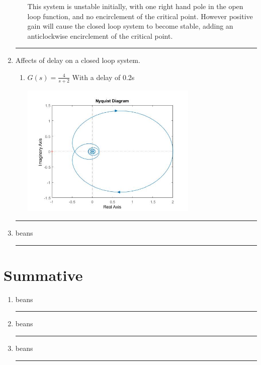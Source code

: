 \documentclass[a4paper,11pt]{article}
\begin{document}
\begin{preview}
\begin{enumerate}
\begin{enumerate}
      This system is unstable initially, with one right hand pole in the open loop function, and no encirclement of the critical point. However positive gain will cause the closed loop system to become stable, adding an anticlockwise encirclement of the critical point.\\
    \end{enumerate}


\hrule

\item Affects of delay on a closed loop system.

\begin{enumerate}
  
  \item $ G(s) = \frac{4}{s+2} $ With a delay of 0.2s
  
  \begin{center}
    \includegraphics[width=0.7\textwidth]{A_1/2_a_nyquist.jpg}
  \end{center}
  

\end{enumerate}

\hrule
  
\item beans\\

\hrule
\end{enumerate}

\section*{Summative}

\begin{enumerate}

\item beans


\hrule


\item beans


\hrule


\item beans

\hrule



\end{enumerate}
\end{preview}
\end{document}
